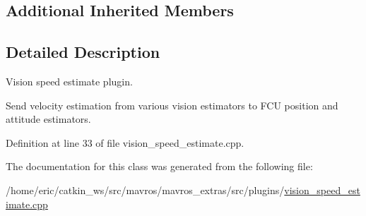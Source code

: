 \subsection*{Additional Inherited Members}


\subsection{Detailed Description}
Vision speed estimate plugin. 

Send velocity estimation from various vision estimators to F\+CU position and attitude estimators. 

Definition at line 33 of file vision\+\_\+speed\+\_\+estimate.\+cpp.



The documentation for this class was generated from the following file\+:\begin{DoxyCompactItemize}
\item 
/home/eric/catkin\+\_\+ws/src/mavros/mavros\+\_\+extras/src/plugins/\mbox{\hyperlink{vision__speed__estimate_8cpp}{vision\+\_\+speed\+\_\+estimate.\+cpp}}\end{DoxyCompactItemize}
